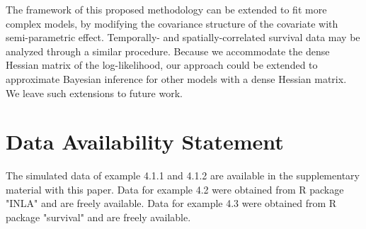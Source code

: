 \documentclass[ba]{imsart}
\begin{document}
The framework of this proposed methodology can be extended to fit more complex models, by modifying the covariance structure of the covariate with semi-parametric effect. Temporally- and spatially-correlated survival data may be analyzed through a similar procedure. Because we accommodate the dense Hessian matrix of the log-likelihood, our approach could be extended to approximate Bayesian inference for other models with a dense Hessian matrix. We leave such extensions to future work.

\section*{Data Availability Statement}
The simulated data of example 4.1.1 and 4.1.2 are available in the supplementary material with this paper. Data for example 4.2 were obtained from R package "INLA" \citep{inla} and are freely available.
Data for example 4.3 were obtained from R package "survival" \citep{survival-package} and are freely available. 


\nocite{*}%

%

\clearpage

\begin{table}
\begin{center}
\end{center}
\caption{Comparison metrics in terms of MSE and posterior coverage rate from 300 independent replications, for the fixed effect parameter in the first simulation study in section \ref{subsubsec:sim1}.}
\label{table:Sim1AggFixed}
\end{table}
\end{document}
